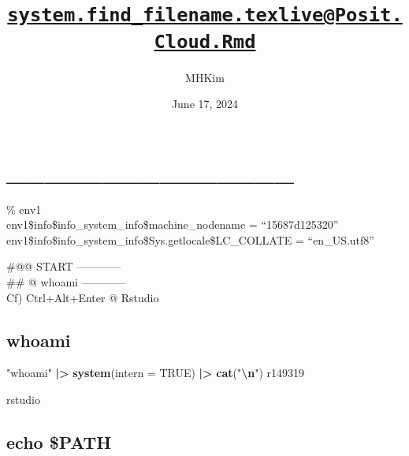 \documentclass[
]{article}
\title{\href{mailto:system.find_filename.texlive@Posit.Cloud.Rmd}{\nolinkurl{system.find\_filename.texlive@Posit.Cloud.Rmd}}}
\author{MHKim}
\date{June 17, 2024}
\newenvironment{Shaded}{\begin{snugshade}}{\end{snugshade}}
\newcommand{\AttributeTok}[1]{\textcolor[rgb]{0.13,0.29,0.53}{#1}}
\newcommand{\ConstantTok}[1]{\textcolor[rgb]{0.56,0.35,0.01}{#1}}
\newcommand{\FunctionTok}[1]{\textcolor[rgb]{0.13,0.29,0.53}{\textbf{#1}}}
\newcommand{\NormalTok}[1]{#1}
\newcommand{\SpecialCharTok}[1]{\textcolor[rgb]{0.81,0.36,0.00}{\textbf{#1}}}
\newcommand{\StringTok}[1]{\textcolor[rgb]{0.31,0.60,0.02}{#1}}
\begin{document}
\maketitle

{
\setcounter{tocdepth}{6}
\tableofcontents
}
\hypertarget{section}{%
\section{\_\_\_\_\_\_\_\_\_\_\_\_\_\_\_}\label{section}}

\% env1\\

env1\$info\$info\_system\_info\$machine\_nodename = ``15687d125320''
env1\$info\$info\_system\_info\$Sys.getlocale\$LC\_COLLATE =
``en\_US.utf8''

\#@@ START ------------\\
\#\# @ whoami ------------\\
Cf) Ctrl+Alt+Enter @ Rstudio

\hypertarget{whoami}{%
\subsection{whoami}\label{whoami}}

\begin{Shaded}
\begin{Highlighting}[]
\StringTok{"whoami"} \SpecialCharTok{|\textgreater{}}
    \FunctionTok{system}\NormalTok{(}\AttributeTok{intern =} \ConstantTok{TRUE}\NormalTok{) }\SpecialCharTok{|\textgreater{}}
    \FunctionTok{cat}\NormalTok{(}\StringTok{"}\SpecialCharTok{\textbackslash{}n}\StringTok{"}\NormalTok{)}
\NormalTok{r149319 }
\end{Highlighting}
\end{Shaded}

rstudio

\hypertarget{echo-path}{%
\subsection{echo \$PATH}\label{echo-path}}
\end{document}

